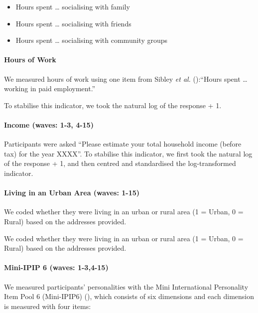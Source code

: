 \documentclass[
  single column]{article}
\let\oldparagraph\paragraph
\renewcommand{\paragraph}[1]{\oldparagraph{#1}\mbox{}}
\providecommand{\tightlist}{%
  \setlength{\itemsep}{0pt}\setlength{\parskip}{0pt}}\usepackage{longtable,booktabs,array}
\begin{document}
\begin{itemize}
\tightlist
\item
  Hours spent \ldots{} socialising with family
\item
  Hours spent \ldots{} socialising with friends
\item
  Hours spent \ldots{} socialising with community groups
\end{itemize}

\paragraph{Hours of Work}\label{hours-of-work}

We measured hours of work using one item from Sibley \emph{et al.}
():``Hours spent \ldots{} working in paid
employment.''

To stabilise this indicator, we took the natural log of the response +
1.

\paragraph{Income (waves: 1-3, 4-15)}\label{income-waves-1-3-4-15}

Participants were asked ``Please estimate your total household income
(before tax) for the year XXXX''. To stabilise this indicator, we first
took the natural log of the response + 1, and then centred and
standardised the log-transformed indicator.

\paragraph{Living in an Urban Area (waves:
1-15)}\label{living-in-an-urban-area-waves-1-15}

We coded whether they were living in an urban or rural area (1 = Urban,
0 = Rural) based on the addresses provided.

We coded whether they were living in an urban or rural area (1 = Urban,
0 = Rural) based on the addresses provided.

\paragraph{Mini-IPIP 6 (waves:
1-3,4-15)}\label{mini-ipip-6-waves-1-34-15}

We measured participants' personalities with the Mini International
Personality Item Pool 6 (Mini-IPIP6) (), which consists of six dimensions and each
dimension is measured with four items:
\end{document}
